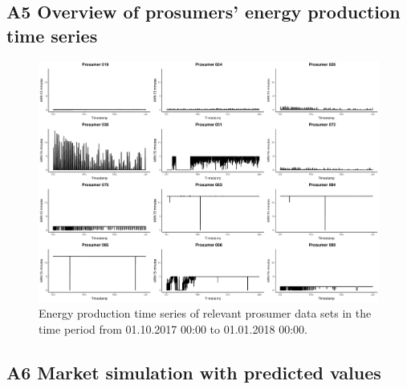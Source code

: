 \subsection*{\hypertarget{AppA5:Figures:producer_all}{A5} Overview of prosumers' energy production time series}\label{AppA5:Figures:producer_all}

\begin{figure}[H]
    \centering
    \includegraphics[width=\textwidth]{thesis/graphs/marketsimulation/producers_all.pdf}
    \caption[Energy production time series of relevant prosumer data sets]{Energy production time series of relevant prosumer data sets in the time period from 01.10.2017 00:00 to 01.01.2018 00:00. \quantnet\href{ }{}}
\end{figure}

\newpage
\subsection*{\hypertarget{AppA6:Figures:marketsimulation_pred}{A6} Market simulation with predicted values}\label{AppA6:Figures:marketsimulation_pred}

